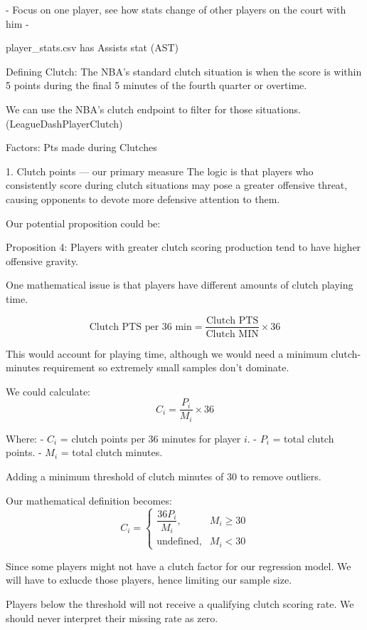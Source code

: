 - Focus on one player, see how stats change of other players on the court with him
- 



player_stats.csv has Assists stat (AST)

Defining Clutch: 
The NBA's standard clutch situation is when the score is within 5 points during the final 5 minutes of the fourth quarter or overtime.

We can use the NBA's clutch endpoint to filter for those situations.
(LeagueDashPlayerClutch)

Factors: Pts made during Clutches

1. Clutch points — our primary measure
The logic is that players who consistently score during clutch situations may pose a greater offensive threat, causing opponents to devote more defensive attention to them.

Our potential proposition could be:

Proposition 4: Players with greater clutch scoring production tend to have higher offensive gravity.

One mathematical issue is that players have different amounts of clutch playing time.

\[
\text{Clutch PTS per 36 min}
=\frac{\text{Clutch PTS}}{\text{Clutch MIN}}\times36
\]

This would account for playing time, although we would need a minimum clutch-minutes requirement so extremely small samples don't dominate.

We could calculate:
\[
C_i=\frac{P_i}{M_i}\times36
\]

Where:
- \(C_i\) = clutch points per 36 minutes for player \(i\).
- \(P_i\) = total clutch points.
- \(M_i\) = total clutch minutes.

Adding a minimum threshold of clutch minutes of 30 to remove outliers.

Our mathematical definition becomes:
\[
C_i =
\begin{cases}
\dfrac{36P_i}{M_i}, & M_i\geq 30\\[6pt]
\text{undefined}, & M_i<30
\end{cases}
\]

Since some players might not have a clutch factor for our regression model. We will have to exlucde those players, hence limiting our sample size.





Players below the threshold will not receive a qualifying clutch scoring rate. We should never interpret their missing rate as zero.




